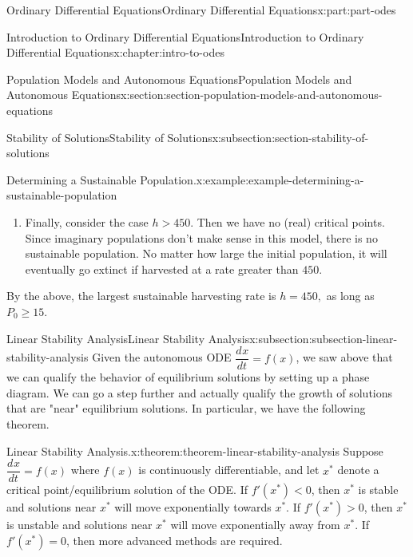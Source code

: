 \documentclass[twoside,10pt,]{book}
\newcommand{\terminology}[1]{\textbf{#1}}
\numberwithin{equation}{part}
\providecommand{\dv}[3][]{\dfrac{d^{#1} #2}{d #3^{#1}}}
\newcommand{\lt}{<}
\newcommand{\gt}{>}
\begin{document}
\begin{partptx}{Ordinary Differential Equations}{}{Ordinary Differential Equations}{}{}{x:part:part-odes}
\begin{chapterptx}{Introduction to Ordinary Differential Equations}{}{Introduction to Ordinary Differential Equations}{}{}{x:chapter:intro-to-odes}
\begin{sectionptx}{Population Models and Autonomous Equations}{}{Population Models and Autonomous Equations}{}{}{x:section:section-population-models-and-autonomous-equations}
\begin{subsectionptx}{Stability of Solutions}{}{Stability of Solutions}{}{}{x:subsection:section-stability-of-solutions}
\begin{example}{Determining a Sustainable Population.}{x:example:example-determining-a-sustainable-population}
\begin{enumerate}
\begin{figureptx}{}{g:figure:idp105548816421280}{}
\begin{image}{0.25}{0.5}{0.25}
{
}%
\end{image}%
\tcblower
\end{figureptx}%
We interpret the phase diagram as follows: if \(P\) is less than 15,000%
 then the population will collapse to extinction. Otherwise, the population will stabilize at \(15,000\). This type of critical point is often called \terminology{semi-stable.}%
\item{}Finally, consider the case \(h \gt 450\). Then we have no (real) critical points. Since imaginary populations don't make sense in this model, there is no sustainable population. No matter how large the initial population, it will eventually go extinct if harvested at a rate greater than \(450\).%
\end{enumerate}
By the above, the largest sustainable harvesting rate is \(h = 450,\) as long as \(P_{0}\geq 15\).%
\end{example}
\end{subsectionptx}
%
%
\typeout{************************************************}
\typeout{************************************************}
%
\begin{subsectionptx}{Linear Stability Analysis}{}{Linear Stability Analysis}{}{}{x:subsection:subsection-linear-stability-analysis}
Given the autonomous ODE \(\dv{x}{t} = f(x)\), we saw above that we can qualify the behavior of equilibrium solutions by setting up a phase diagram. We can go a step further and actually qualify the growth of solutions that are "near" equilibrium solutions. In particular, we have the following theorem.%
\begin{theorem}{Linear Stability Analysis.}{}{x:theorem:theorem-linear-stability-analysis}%
Suppose \(\dv{x}{t} = f(x)\) where \(f(x)\) is continuously differentiable, and let \(x^{*}\) denote a critical point\slash{}equilibrium solution of the ODE. If \(f'(x^{*}) \lt 0\), then \(x^{*}\) is stable and solutions near \(x^{*}\) will move exponentially towards \(x^{*}\). If \(f'(x^{*}) \gt 0\), then \(x^{*}\) is unstable and solutions near \(x^{*}\) will move exponentially away from \(x^{*}\). If \(f'(x^{*}) = 0\), then more advanced methods are required.%
\end{theorem}

\end{subsectionptx}
\end{sectionptx}
\end{chapterptx}
\end{partptx}
\end{document}
